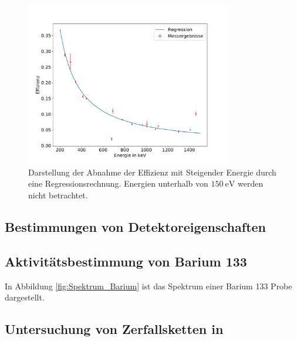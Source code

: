 \begin{figure}
\centering
\includegraphics[width=0.8\textwidth]{python/plots/effizienz.pdf}
\caption{Darstellung der Abnahme der Effizienz mit Steigender Energie durch eine Regressionsrechnung. Energien unterhalb von $\SI{150}{\electronvolt}$ werden nicht betrachtet.}
\label{fig:Effizienz}
\end{figure}
\subsection{Bestimmungen von Detektoreigenschaften}
\label{subsec:a2}






\subsection{Aktivitätsbestimmung von Barium 133}
\label{subsec:a3}
In Abbildung \ref{fig:Spektrum_Barium} ist das Spektrum einer Barium 133 Probe dargestellt.


\subsection{Untersuchung von Zerfallsketten in }
\label{subsec:a4}



